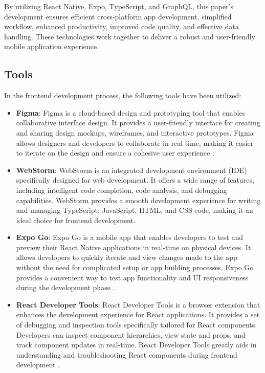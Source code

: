 By utilizing React Native, Expo, TypeScript, and GraphQL, this paper's development ensures efficient cross-platform app development, simplified workflow, enhanced productivity, improved code quality, and effective data handling. These technologies work together to deliver a robust and user-friendly mobile application experience.

\subsection{Tools}
In the frontend development process, the following tools have been utilized:

\begin{itemize}
\item \textbf{Figma}: Figma is a cloud-based design and prototyping tool that enables collaborative interface design. It provides a user-friendly interface for creating and sharing design mockups, wireframes, and interactive prototypes. Figma allows designers and developers to collaborate in real time, making it easier to iterate on the design and ensure a cohesive user experience \cite{figma}.

\item \textbf{WebStorm}: WebStorm is an integrated development environment (IDE) specifically designed for web development. It offers a wide range of features, including intelligent code completion, code analysis, and debugging capabilities. WebStorm provides a smooth development experience for writing and managing TypeScript, JavaScript, HTML, and CSS code, making it an ideal choice for frontend development. \cite{webstorm}

\item \textbf{Expo Go}: Expo Go is a mobile app that enables developers to test and preview their React Native applications in real-time on physical devices. It allows developers to quickly iterate and view changes made to the app without the need for complicated setup or app building processes. Expo Go provides a convenient way to test app functionality and UI responsiveness during the development phase \cite{expogo}.

\item \textbf{React Developer Tools}: React Developer Tools is a browser extension that enhances the development experience for React applications. It provides a set of debugging and inspection tools specifically tailored for React components. Developers can inspect component hierarchies, view state and props, and track component updates in real-time. React Developer Tools greatly aids in understanding and troubleshooting React components during frontend development \cite{reactdevtools}.


\end{itemize}
